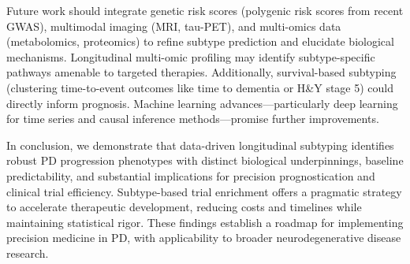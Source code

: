 Future work should integrate genetic risk scores (polygenic risk scores from recent GWAS\cite{nalls2019identification}), multimodal imaging (MRI, tau-PET\cite{passamonti2017tau}), and multi-omics data (metabolomics, proteomics\cite{maass2020multimodal}) to refine subtype prediction and elucidate biological mechanisms. Longitudinal multi-omic profiling may identify subtype-specific pathways amenable to targeted therapies. Additionally, survival-based subtyping (clustering time-to-event outcomes like time to dementia or H\&Y stage 5) could directly inform prognosis. Machine learning advances—particularly deep learning for time series\cite{fortuin2020gp} and causal inference methods\cite{schulam2019can}—promise further improvements.

In conclusion, we demonstrate that data-driven longitudinal subtyping identifies robust PD progression phenotypes with distinct biological underpinnings, baseline predictability, and substantial implications for precision prognostication and clinical trial efficiency. Subtype-based trial enrichment offers a pragmatic strategy to accelerate therapeutic development, reducing costs and timelines while maintaining statistical rigor. These findings establish a roadmap for implementing precision medicine in PD, with applicability to broader neurodegenerative disease research.
